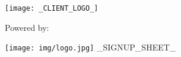 \texttt{[image: \_CLIENT\_LOGO\_]}

\vspace{100px}

\centerline{\huge Powered by:}
\texttt{[image: img/logo.jpg]}
\newpage
_SIGNUP_SHEET_
\newpage